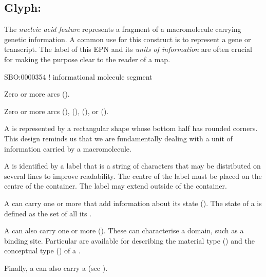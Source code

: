 
\subsection{Glyph: }
\label{sec:genetic}

The \emph{nucleic acid feature} represents a fragment of a macromolecule carrying genetic information.
A common use for this construct is to represent a gene or transcript.
The label of this EPN and its \emph{units of information} are often crucial for making the purpose clear to the reader of a map.

\begin{glyphDescription}

\glyphSboTerm
SBO:0000354 ! informational molecule segment


\glyphIncoming
Zero or more  arcs ().



\glyphOutgoing
Zero or more  arcs (),  (),  (), or  ().


\glyphContainer
A  is represented by a rectangular shape whose bottom half has rounded corners.
This design reminds us that we are fundamentally dealing with a unit of information carried by a macromolecule.

\glyphLabel
A  is identified by a label that is  a string of characters that may be distributed on several lines to improve readability.
The centre of the label must be placed on the centre of the container.
The label may extend outside of the container.

\glyphAux
A  can carry one or more  that add information about its state ().
The state of a  is defined as the set of all its .

A  can also carry one or more  ().
These can characterise a domain, such as a binding site.
Particular  are available for describing the material type () and the conceptual type () of a .

Finally, a  can also carry a  (see ).

\end{glyphDescription}

